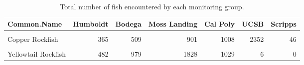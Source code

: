 \documentclass[
]{article}
\begin{document}
\FloatBarrier
\newpage

\FloatBarrier

\begin{table}

\caption{\label{tab:totalfishbygroup}Total number of fish encountered by each monitoring group.}
\centering
\begin{tabular}[t]{lrrrrrr}
\toprule
Common.Name & Humboldt & Bodega & Moss Landing & Cal Poly & UCSB & Scripps\\
\midrule
\cellcolor{gray!6}{Black Rockfish} & \cellcolor{gray!6}{1296} & \cellcolor{gray!6}{1488} & \cellcolor{gray!6}{13272} & \cellcolor{gray!6}{1744} & \cellcolor{gray!6}{2} & \cellcolor{gray!6}{0}\\
Copper Rockfish & 365 & 509 & 901 & 1008 & 2352 & 46\\
\cellcolor{gray!6}{Quillback Rockfish} & \cellcolor{gray!6}{220} & \cellcolor{gray!6}{39} & \cellcolor{gray!6}{1} & \cellcolor{gray!6}{1} & \cellcolor{gray!6}{0} & \cellcolor{gray!6}{0}\\
Yellowtail Rockfish & 482 & 979 & 1828 & 1029 & 6 & 0\\
\bottomrule
\end{tabular}
\end{table}
\end{document}
